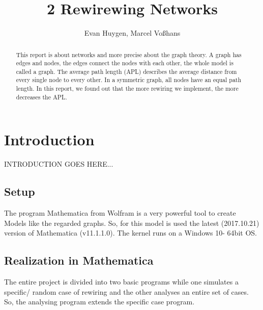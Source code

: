 \documentclass[11pt,a4paper]{article}
\begin{document}
\title{2 Rewirewing Networks}
\author{Evan Huygen, Marcel Vo{\ss}hans}
\maketitle

\begin{abstract}
This report is about networks and more precise about the graph theory. A graph has edges and nodes, the edges connect the nodes with each other, the whole model is called a graph. The average path length (APL) describes the average distance from every single node to every other. In a symmetric graph, all nodes have an equal path length. In this report, we found out that the more rewiring we implement, the more decreases the APL.
\end{abstract}

\tableofcontents

\section{Introduction}
INTRODUCTION GOES HERE...
 \subsection{Setup}
The program Mathematica from Wolfram is a very powerful tool to create Models like the regarded graphs. So, for this model is used the latest (2017.10.21) version of Mathematica (v11.1.1.0). The kernel runs on a Windows 10- 64bit OS.
 \subsection{Realization in Mathematica}
The entire project is divided into two basic programs while one simulates a specific/ random case of rewiring and the other analyses an entire set of cases. So, the analysing program extends the specific case program. 
\end{document}
